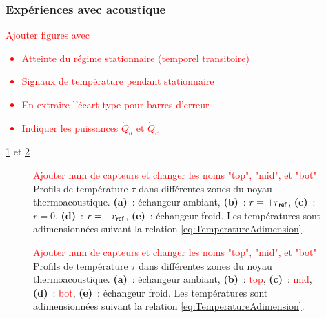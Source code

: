 \subsubsection{Expériences avec acoustique}

\textcolor{red}{Ajouter figures avec \begin{itemize}
    \item Atteinte du régime stationnaire (temporel transitoire)
    \item Signaux de température pendant stationnaire
    \item En extraire l'écart-type pour barres d'erreur
    \item Indiquer les puissances $\dot Q_a$ et $\dot Q_c$
\end{itemize}}

\ref{fig:FrigoToupie_Profils_H12_WaterAcou} et \ref{fig:FrigoToupie_Profils_V12_WaterAcou}

\begin{figure}[ht!]
    \centering
    
    \caption{\textcolor{red}{Ajouter num de capteurs et changer les noms "top", "mid", et "bot"} Profils de température $\tau$ dans différentes zones du noyau thermoacoustique. {\bf (a)}~: échangeur ambiant, {\bf (b)}~: $r=+r_{\sf ref}$, {\bf (c)}~: $r=0$, {\bf (d)}~: $r=-r_{\sf ref}$, {\bf (e)}~: échangeur froid. Les températures sont adimensionnées suivant la relation \eqref{eq:TemperatureAdimension}.}
    \label{fig:FrigoToupie_Profils_H12_WaterAcou}
\end{figure}

\begin{figure}[ht!]
    \centering
    
    \caption{\textcolor{red}{Ajouter num de capteurs et changer les noms "top", "mid", et "bot"} Profils de température $\tau$ dans différentes zones du noyau thermoacoustique. {\bf (a)}~: échangeur ambiant, {\bf (b)}~: \textcolor{red}{top}, {\bf (c)}~: \textcolor{red}{mid}, {\bf (d)}~: \textcolor{red}{bot}, {\bf (e)}~: échangeur froid. Les températures sont adimensionnées suivant la relation \eqref{eq:TemperatureAdimension}.}
    \label{fig:FrigoToupie_Profils_V12_WaterAcou}
\end{figure}